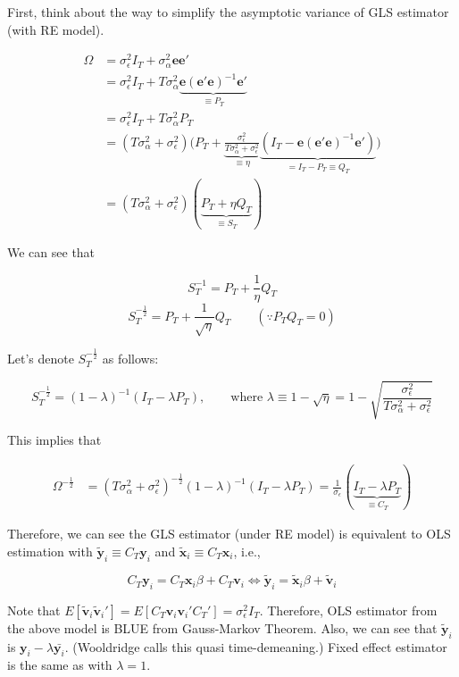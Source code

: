 \documentclass[11pt]{article}
\begin{document}
First, think about the way to simplify the asymptotic variance of GLS estimator (with RE model).

\begin{align*}
\Omega & = \sigma_\epsilon^2 I_T  +  \sigma_\alpha^2 \mathbf{e}\mathbf{e}'\\
&= \sigma_\epsilon^2 I_T  + T \sigma_\alpha^2\underbrace{ \mathbf{e}(\mathbf{e}'\mathbf{e})^{-1} \mathbf{e}'}_{\equiv P_T}\\
&= \sigma_\epsilon^2 I_T + T\sigma_\alpha^2 P_T\\
&= (T\sigma_\alpha^2 + \sigma_\epsilon^2) \bigg( P_T + \underbrace{\frac{\sigma_\epsilon^2}{T\sigma_\alpha^2 + \sigma_\epsilon^2}}_{\equiv \eta} \underbrace{(I_T - \mathbf{e}(\mathbf{e}' \mathbf{e})^{-1} \mathbf{e}' )}_{= I_T - P_T \equiv Q_T} \bigg)\\
&= (T\sigma_\alpha^2 + \sigma_\epsilon^2 ) (\underbrace{P_T + \eta Q_T}_{\equiv S_T})
\end{align*}


We can see that 

\[
S_T^{-1} = P_T +\frac{1}{\eta} Q_T
\]
\[
S_T^{-\frac{1}{2}} = P_T + \frac{1}{\sqrt{\eta}} Q_T \qquad (\because P_T Q_T = 0)
\]

Let's denote $S_T^{-\frac{1}{2}}$ as follows:

\[
S_T^{-\frac{1}{2}} = (1-\lambda)^{-1} (I_T - \lambda P_T), \qquad \text{where} \,\, \lambda \equiv 1-\sqrt{\eta} = 1-  \sqrt{\frac{\sigma_\epsilon^2}{T\sigma_\alpha^2 + \sigma_\epsilon^2}}
\]


This implies that 

\begin{align*}
\Omega^{-\frac{1}{2}} & = (T\sigma_\alpha^2 + \sigma_\epsilon^2)^{-\frac{1}{2}} (1-\lambda)^{-1} (I_T - \lambda P_T ) = \frac{1}{\sigma_\epsilon} (\underbrace{I_T -\lambda P_T}_{\equiv C_T} ) 
\end{align*}

Therefore, we can see the GLS estimator (under RE model) is equivalent to OLS estimation with $\widetilde{\mathbf{y}}_i \equiv C_T \mathbf{y}_i$ and $\widetilde{\mathbf{x}}_i \equiv C_T \mathbf{x}_i$, i.e.,

\[
C_T \mathbf{y}_i =C_T \mathbf{x}_i \beta + C_T \mathbf{v}_i  \Leftrightarrow \widetilde{\mathbf{y}}_i=\widetilde{\mathbf{x}}_i \beta + \widetilde{\mathbf{v}}_i
\] 

Note that $ E[\widetilde{\mathbf{v}}_i \widetilde{\mathbf{v}}_i'] = E[C_T \mathbf{v}_i \mathbf{v}_i' C_T'] = \sigma_\epsilon^2 I_T$. Therefore, OLS estimator from the above model is BLUE from Gauss-Markov Theorem. Also, we can see that $\widetilde{\mathbf{y}}_i$ is $\mathbf{y}_i - \lambda \bar{\mathbf{y}_i} $. (Wooldridge calls this quasi time-demeaning.) Fixed effect estimator is the same as with $\lambda =1$. 
\end{document}
